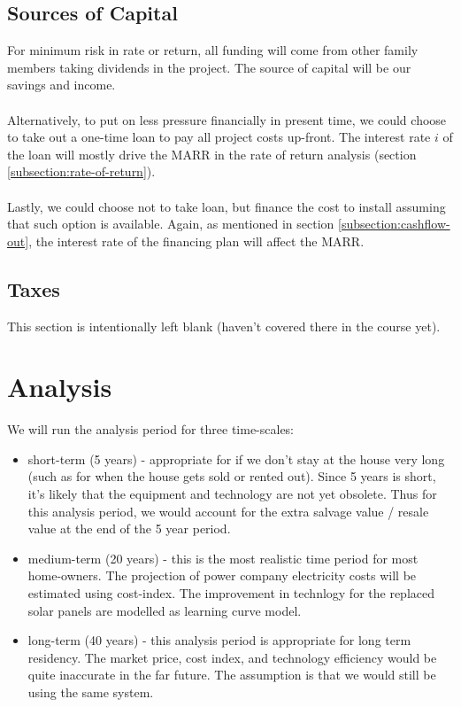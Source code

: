 \documentclass[10pt,letterpaper]{article}
\begin{document}
\subsection{Sources of Capital}

For minimum risk in rate or return, all funding will come from other family members taking dividends in the project. The source of capital will be our savings and income.\\
\\
Alternatively, to put on less pressure financially in present time, we could choose to take out a one-time loan to pay all project costs up-front. The interest rate $i$ of the loan will mostly drive the MARR in the rate of return analysis (section \ref{subsection:rate-of-return}).\\
\\
Lastly, we could choose not to take loan, but finance the cost to install assuming that such option is available. Again, as mentioned in section \ref{subsection:cashflow-out}, the interest rate of the financing plan will affect the MARR.\\

\subsection{Taxes}
\begin{center}
	This section is intentionally left blank (haven't covered there in the course yet).\\
\end{center}

\section{Analysis}

We will run the analysis period for three time-scales: 

\begin{itemize}
	\item short-term (5 years) - appropriate for if we don't stay at the house very long (such as for when the house gets sold or rented out). Since 5 years is short, it's likely that the equipment and technology are not yet obsolete. Thus for this analysis period, we would account for the extra salvage value / resale value at the end of the 5 year period.\\

	\item medium-term (20 years) - this is the most realistic time period for most home-owners. The projection of power company electricity costs will be estimated using cost-index. The improvement in technlogy for the replaced solar panels are modelled as learning curve model.\\

	\item long-term (40 years) - this analysis period is appropriate for long term residency. The market price, cost index, and technology efficiency would be quite inaccurate in the far future. The assumption is that we would still be using the same system.
\end{itemize}
\end{document}
